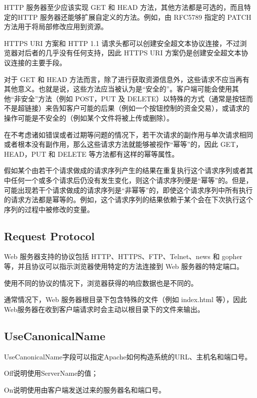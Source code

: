 HTTP 服务器至少应该实现 GET 和 HEAD 方法，其他方法都是可选的，而且特定的HTTP 服务器还能够扩展自定义的方法。例如，由 RFC5789 指定的 PATCH 方法用于将局部修改应用到资源。

HTTPS URI 方案和 HTTP 1.1 请求头都可以创建安全超文本协议连接，不过浏览器对后者的几乎没有任何支持，因此 HTTPS URI 方案仍是创建安全超文本协议连接的主要手段。

对于 GET 和 HEAD 方法而言，除了进行获取资源信息外，这些请求不应当再有其他意义。也就是说，这些方法应当被认为是“安全的”。客户端可能会使用其他“非安全”方法（例如 POST，PUT 及 DELETE）以特殊的方式（通常是按钮而不是超链接）来告知客户可能的后果（例如一个按钮控制的资金交易），或请求的操作可能是不安全的（例如某个文件将被上传或删除）。

在不考虑诸如错误或者过期等问题的情况下，若干次请求的副作用与单次请求相同或者根本没有副作用，那么这些请求方法就能够被视作“幂等”的，因此 GET，HEAD，PUT 和 DELETE 等方法都有这样的幂等属性。

假如某个由若干个请求做成的请求序列产生的结果在重复执行这个请求序列或者其中任何一个或多个请求后仍没有发生变化，则这个请求序列便是“幂等”的。但是，可能出现若干个请求做成的请求序列是“非幂等”的，即使这个请求序列中所有执行的请求方法都是幂等的。例如，这个请求序列的结果依赖于某个会在下次执行这个序列的过程中被修改的变量。

\subsection{Request Protocol}

Web 服务器支持的协议包括 HTTP、HTTPS、FTP、Telnet、news 和 gopher 等，并且协议可以指示浏览器使用特定的方法连接到 Web 服务器的特定端口。

使用不同的协议的情况下，浏览器获得的响应数据也是不同的。

通常情况下，Web 服务器根目录下包含特殊的文件（例如 index.html 等），因此 Web服务器在收到客户端请求时会主动以根目录下的文件来输出。

\subsection{UseCanonicalName}

UseCanonicalName字段可以指定Apache如何构造系统的URL、主机名和端口号。

\begin{compactitem}
\item Off说明使用ServerName的值；
\item On说明使用由客户端发送过来的服务器名和端口号。
\end{compactitem}





